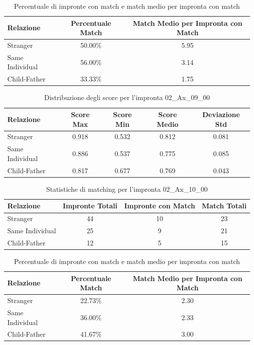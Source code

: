 \begin{table}[htbp]
\centering
\caption{Percentuale di impronte con match e match medio per impronta con match}
\label{tab:match_percentage_02_Ax_09_00}
\begin{tabular}{|l|c|c|}
\hline
\textbf{Relazione} & \textbf{Percentuale Match} & \textbf{Match Medio per Impronta con Match} \\
\hline
Stranger & 50.00\% & 5.95 \\
\hline
Same Individual & 56.00\% & 3.14 \\
\hline
Child-Father & 33.33\% & 1.75 \\
\hline
\end{tabular}
\end{table}


\begin{table}[htbp]
\centering
\caption{Distribuzione degli score per l'impronta 02\_Ax\_09\_00}
\label{tab:scores_02_Ax_09_00}
\begin{tabular}{|l|c|c|c|c|}
\hline
\textbf{Relazione} & \textbf{Score Max} & \textbf{Score Min} & \textbf{Score Medio} & \textbf{Deviazione Std} \\
\hline
Stranger & 0.918 & 0.532 & 0.812 & 0.081 \\
\hline
Same Individual & 0.886 & 0.537 & 0.775 & 0.085 \\
\hline
Child-Father & 0.817 & 0.677 & 0.769 & 0.043 \\
\hline
\end{tabular}
\end{table}


\begin{table}[htbp]
\centering
\caption{Statistiche di matching per l'impronta 02\_Ax\_10\_00}
\label{tab:results_02_Ax_10_00}
\begin{tabular}{|l|c|c|c|}
\hline
\textbf{Relazione} & \textbf{Impronte Totali} & \textbf{Impronte con Match} & \textbf{Match Totali} \\
\hline
Stranger & 44 & 10 & 23 \\
\hline
Same Individual & 25 & 9 & 21 \\
\hline
Child-Father & 12 & 5 & 15 \\
\hline
\end{tabular}
\end{table}


\begin{table}[htbp]
\centering
\caption{Percentuale di impronte con match e match medio per impronta con match}
\label{tab:match_percentage_02_Ax_10_00}
\begin{tabular}{|l|c|c|}
\hline
\textbf{Relazione} & \textbf{Percentuale Match} & \textbf{Match Medio per Impronta con Match} \\
\hline
Stranger & 22.73\% & 2.30 \\
\hline
Same Individual & 36.00\% & 2.33 \\
\hline
Child-Father & 41.67\% & 3.00 \\
\hline
\end{tabular}
\end{table}


